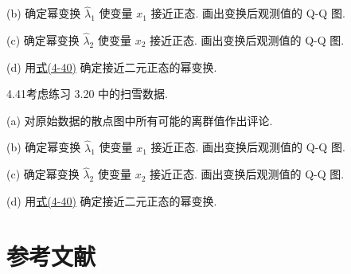 (b) 确定幂变换 $\hat{\lambda}_{1}$ 使变量 $x_{1}$ 接近正态. 画出变换后观测值的 Q-Q 图.

(c) 确定幂变换 $\hat{\lambda}_{2}$ 使变量 $x_{2}$ 接近正态. 画出变换后观测值的 Q-Q 图.

(d) 用\hyperref[eq:4-40]{式(4-40)} 确定接近二元正态的幂变换.

4.41\quad 考虑练习 3.20 中的扫雪数据.

(a) 对原始数据的散点图中所有可能的离群值作出评论.

(b) 确定幂变换 $\hat{\lambda}_{1}$ 使变量 $x_{1}$ 接近正态. 画出变换后观测值的 Q-Q 图.

(c) 确定幂变换 $\hat{\lambda}_{2}$ 使变量 $x_{2}$ 接近正态. 画出变换后观测值的 Q-Q 图.

(d) 用\hyperref[eq:4-40]{式(4-40)} 确定接近二元正态的幂变换.

\label{bib:4}
\section*{参考文献}

